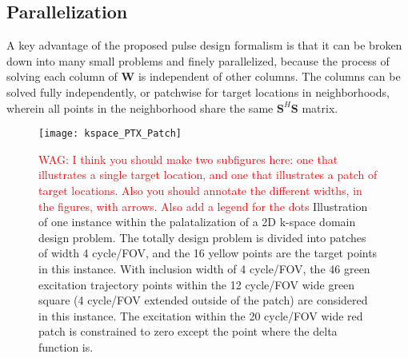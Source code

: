 \subsection*{Parallelization}
\par A key advantage of the proposed pulse design formalism is that it can be broken down into many small problems and finely parallelized, because the process of solving each column of $\mathbf{W}$ is independent of other columns. The columns can be solved fully independently, or patchwise for target locations in neighborhoods, wherein all points in the neighborhood share the same $\mathbf{S}^{H}\mathbf{S}$ matrix. 
\begin{figure}
	\centering
	\texttt{[image: kspace\_PTX\_Patch]}
	\caption{\textcolor{red}{WAG: I think you should make two subfigures here: one that illustrates a single target location, and one that illustrates a patch of target locations. Also you should annotate the different widths, in the figures, with arrows. Also add a legend for the dots} 
	Illustration of one instance within the palatalization of a 2D k-space domain design problem. The totally design problem is divided into patches of width 4 cycle/FOV, and the 16 yellow points are the target points in this instance. With inclusion width of 4 cycle/FOV, the 46 green excitation trajectory points within the 12 cycle/FOV wide green square (4 cycle/FOV extended outside of the patch) are considered in this instance. The excitation within the 20 cycle/FOV wide red patch is constrained to zero except the point where the delta function is.}
	\label{fig:Patch}
\end{figure}
